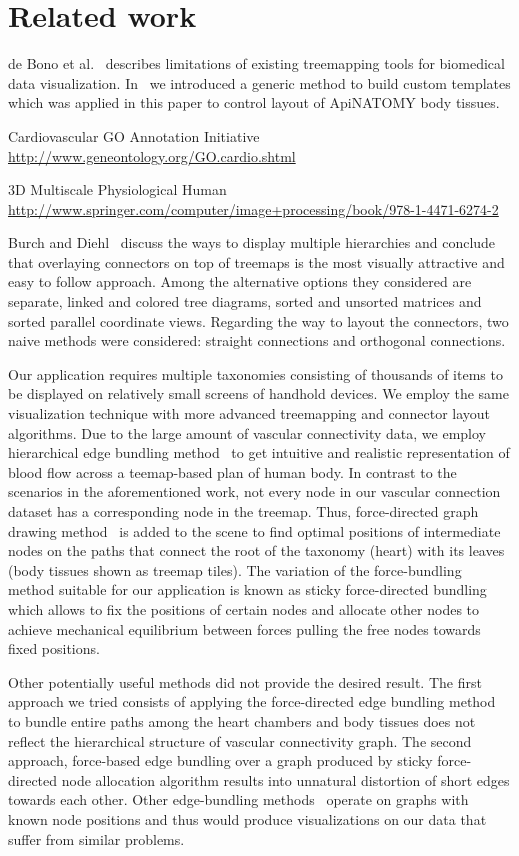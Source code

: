 \section{Related work}
\label{sect:relatedWork}

de Bono et al.~\cite{BGS12} describes limitations of existing treemapping tools for biomedical data visualization. In~\cite{} we introduced a generic method to build custom templates which was applied in this paper to control layout of ApiNATOMY body tissues.

Cardiovascular GO Annotation Initiative \url{http://www.geneontology.org/GO.cardio.shtml}

3D Multiscale Physiological Human \url{http://www.springer.com/computer/image+processing/book/978-1-4471-6274-2}

Burch and Diehl~\cite{BD06} discuss the ways to display multiple hierarchies and conclude that overlaying connectors on top of treemaps is the most visually attractive and easy to follow approach. Among the alternative options they considered are separate, linked and colored tree diagrams, sorted and unsorted matrices and sorted parallel coordinate views. Regarding the way to layout the connectors, two naive methods were considered: straight connections and orthogonal connections.

Our application requires multiple taxonomies consisting of thousands of items to be displayed on relatively small screens of handhold devices. We employ the same visualization technique with more advanced treemapping and connector layout algorithms. Due to the large amount of vascular connectivity data, we employ hierarchical edge bundling method~\cite{Hol06} to get intuitive and realistic representation of blood flow across a teemap-based plan of human body.
In contrast to the scenarios in the aforementioned work, not every node in our vascular connection dataset has a corresponding node in the treemap. Thus, force-directed graph drawing method~\cite{} is added to the scene to find optimal positions of intermediate nodes on the paths that connect the root of the taxonomy (heart) with its leaves (body tissues shown as treemap tiles). The variation of the force-bundling method suitable for our application is known as sticky force-directed bundling~\cite{} which allows to fix the positions of certain nodes and allocate other nodes to achieve mechanical equilibrium between forces pulling the free nodes towards fixed positions.

Other potentially useful methods did not provide the desired result. The first approach we tried consists of applying the
force-directed edge bundling method~\cite{HW09} to bundle entire paths among the heart chambers and body tissues does not reflect the hierarchical structure of vascular connectivity graph. The second approach, force-based edge bundling over a graph produced by sticky force-directed node allocation algorithm results into unnatural distortion of short edges towards each other. Other edge-bundling methods~\cite{} operate on graphs with known node positions and thus would produce visualizations on our data that suffer from similar problems.




